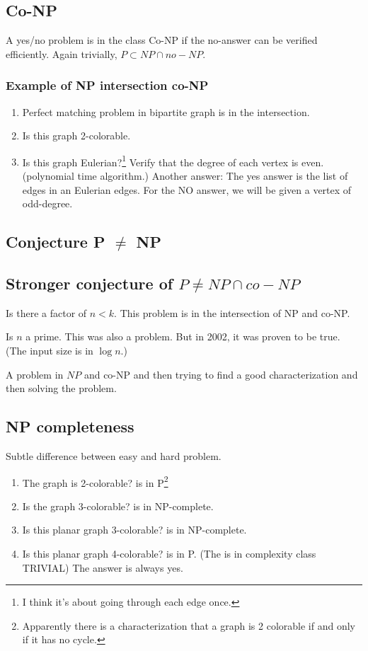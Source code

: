 \documentclass[11pt]{article}
\begin{document}
\subsection{Co-NP}
\label{sec:orgb0f7e60}
A yes/no problem is in the class Co-NP if the no-answer can be verified
efficiently. Again trivially, \(P \subset NP \cap no-NP\).
\subsubsection{Example of NP intersection co-NP}
\label{sec:org9fe2af9}
\begin{enumerate}
\item Perfect matching problem in bipartite graph is in the intersection.
\item Is this graph 2-colorable.
\item Is this graph Eulerian?\footnote{I think it's about going through each edge once.} Verify that the degree of each vertex is even.
(polynomial time algorithm.) Another answer: The yes answer is the list
of edges in an Eulerian edges. For the NO answer, we will be given a
vertex of odd-degree.
\end{enumerate}
\subsection{Conjecture P \(\neq\) NP}
\label{sec:org742ca97}
\subsection{Stronger conjecture of \(P \neq NP \cap co-NP\)}
\label{sec:org6dd8adc}
Is there a factor of \(n < k\). This problem is in the intersection of NP and
co-NP.

Is \(n\) a prime. This was also a problem. But in 2002, it was proven to be
true. (The input size is in \(\log n\).)

A problem in \(NP\) and co-NP and then trying to find a good characterization
and then solving the problem.
\subsection{NP completeness}
\label{sec:orgeef1bec}
Subtle difference between easy and hard problem.
\begin{enumerate}
\item The graph is 2-colorable? is in P\footnote{Apparently there is a characterization that a graph is 2 colorable if and
only if it has no cycle.}
\item Is the graph 3-colorable? is in NP-complete.
\item Is this planar graph 3-colorable? is in NP-complete.
\item Is this planar graph 4-colorable? is in P. (The is in complexity class TRIVIAL)
The answer is always yes.
\end{enumerate}
\end{document}
